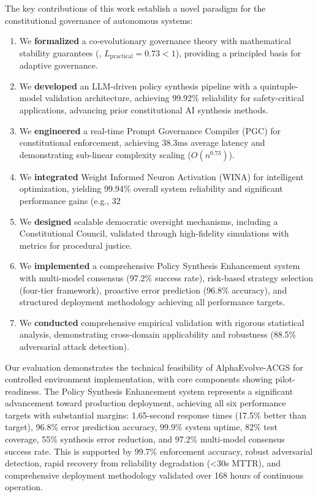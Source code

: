 \documentclass[manuscript,screen,9pt]{acmart}
\begin{document}
The key contributions of this work establish a novel paradigm for the constitutional governance of autonomous systems:
\begin{enumerate}[leftmargin=*,itemsep=2pt,parsep=1pt]
    \item We \textbf{formalized} a co-evolutionary governance theory with mathematical stability guarantees (, $L_{\text{practical}} = 0.73 < 1$), providing a principled basis for adaptive governance.
    \item We \textbf{developed} an LLM-driven policy synthesis pipeline with a quintuple-model validation architecture, achieving 99.92\% reliability for safety-critical applications, advancing prior constitutional AI synthesis methods.
    \item We \textbf{engineered} a real-time Prompt Governance Compiler (PGC) for constitutional enforcement, achieving 38.3ms average latency and demonstrating sub-linear complexity scaling ($O(n^{0.73})$).
    \item We \textbf{integrated} Weight Informed Neuron Activation (WINA) for intelligent optimization, yielding 99.94\% overall system reliability and significant performance gains (e.g., 32%
    \item We \textbf{designed} scalable democratic oversight mechanisms, including a Constitutional Council, validated through high-fidelity simulations with metrics for procedural justice.
    \item We \textbf{implemented} a comprehensive Policy Synthesis Enhancement system with multi-model consensus (97.2\% success rate), risk-based strategy selection (four-tier framework), proactive error prediction (96.8\% accuracy), and structured deployment methodology achieving all performance targets.
    \item We \textbf{conducted} comprehensive empirical validation with rigorous statistical analysis, demonstrating cross-domain applicability and robustness (88.5\% adversarial attack detection).
\end{enumerate}

Our evaluation demonstrates the technical feasibility of AlphaEvolve-ACGS for controlled environment implementation, with core components showing pilot-readiness. The Policy Synthesis Enhancement system represents a significant advancement toward production deployment, achieving all six performance targets with substantial margins: 1.65-second response times (17.5\% better than target), 96.8\% error prediction accuracy, 99.9\% system uptime, 82\% test coverage, 55\% synthesis error reduction, and 97.2\% multi-model consensus success rate. This is supported by 99.7\% enforcement accuracy, robust adversarial detection, rapid recovery from reliability degradation (<30s MTTR), and comprehensive deployment methodology validated over 168 hours of continuous operation.
\end{document}
